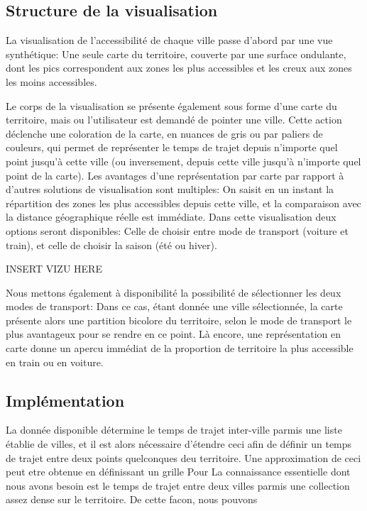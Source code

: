\documentclass{vgtc}                          %
\begin{document}
\subsection{Structure de la visualisation}

\vspace{0.3cm}

La visualisation de l'accessibilité de chaque ville passe d'abord par une vue synthétique: Une seule carte du territoire, couverte par une surface ondulante, dont les pics correspondent aux zones les plus accessibles et les creux aux zones les moins accessibles. 

Le corps de la visualisation se présente également sous forme d'une carte du territoire, mais ou l'utilisateur est demandé de pointer une ville. Cette action déclenche une coloration de la carte, en nuances de gris ou par paliers de couleurs, qui permet de représenter le temps de trajet depuis n'importe quel point jusqu'à cette ville (ou inversement, depuis cette ville jusqu'à n'importe quel point de la carte). Les avantages d'une représentation par carte par rapport à d'autres solutions de visualisation sont multiples: On saisit en un instant la répartition des zones les plus accessibles depuis cette ville, et la comparaison avec la distance géographique réelle est immédiate. Dans cette visualisation deux options seront disponibles: Celle de choisir entre mode de transport (voiture et train), et celle de choisir la saison (été ou hiver). 

\begin{center}
INSERT VIZU HERE
\end{center}


Nous mettons également à disponibilité la possibilité de sélectionner les deux modes de transport: Dans ce cas, étant donnée une ville sélectionnée, la carte présente alors une partition bicolore du territoire, selon le mode de transport le plus avantageux pour se rendre en ce point. Là encore, une représentation en carte donne un apercu immédiat de la proportion de territoire la plus accessible en train ou en voiture.

\subsection{Implémentation}

\vspace{0.3cm}


La donnée disponible détermine le temps de trajet inter-ville parmis une liste établie de villes, et il est alors nécessaire d'étendre ceci afin de définir un temps de trajet entre deux points quelconques deu territoire. Une approximation de ceci peut etre obtenue en définissant un grille  Pour 
La connaissance essentielle dont nous avons besoin est le temps de trajet entre deux villes parmis une collection assez dense sur le territoire. De cette facon, nous pouvons 
\end{document}
